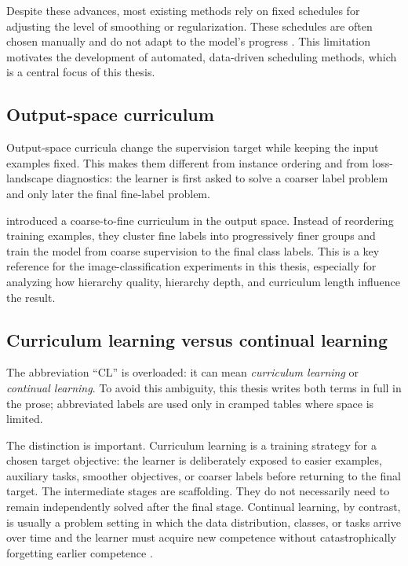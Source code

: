 \documentclass[english,master,a4paper,oneside]{ppfcmthesis}
\begin{document}
Despite these advances, most existing methods rely on fixed schedules for
adjusting the level of smoothing or regularization. These schedules are often
chosen manually and do not adapt to the model's progress \citep{wang2021survey}.
This limitation motivates the development of automated, data-driven scheduling
methods, which is a central focus of this thesis.

\subsection{Output-space curriculum}
Output-space curricula change the supervision target while keeping the input
examples fixed. This makes them different from instance ordering and from
loss-landscape diagnostics: the learner is first asked to solve a coarser label
problem and only later the final fine-label problem.

\citet{stretcuCoarsetoFineCurriculumLearning2021} introduced a
coarse-to-fine curriculum in the output space. Instead of reordering training
examples, they cluster fine labels into progressively finer groups and train the
model from coarse supervision to the final class labels. This is a key
reference for the image-classification experiments in this thesis, especially
for analyzing how hierarchy quality, hierarchy depth, and curriculum length
influence the result.

\subsection{Curriculum learning versus continual learning}

The abbreviation ``CL'' is overloaded: it can mean \emph{curriculum learning}
or \emph{continual learning}. To avoid this ambiguity, this thesis writes both
terms in full in the prose; abbreviated labels are used only in cramped tables
where space is limited.

The distinction is important. Curriculum learning is a training strategy for a
chosen target objective: the learner is deliberately exposed to easier examples,
auxiliary tasks, smoother objectives, or coarser labels before returning to the
final target. The intermediate stages are scaffolding. They do not necessarily
need to remain independently solved after the final stage. Continual learning,
by contrast, is usually a problem setting in which the data distribution,
classes, or tasks arrive over time and the learner must acquire new competence
without catastrophically forgetting earlier competence
\citep{kirkpatrick2017overcoming,lopezpaz2017gradient,parisi2019continual}.
\end{document}

